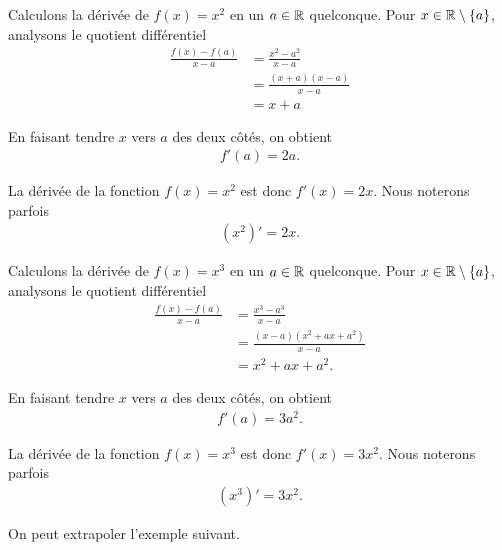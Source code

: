 \documentclass[main.tex]{subfiles}
\begin{document}
\begin{example}
    [Dérivée de $x^2$]

    Calculons la dérivée de $f(x) = x^2$ en un $a \in \mathbb{R}$ quelconque.
    Pour $x \in \mathbb{R} \setminus \{a\}$,
    analysons le quotient différentiel
    \begin{align}
        \frac {f(x) - f(a)}{x - a}
        &= \frac {x^2 - a^2}{x - a}\\
        &= \frac {(x + a)(x - a)}{x - a}\\
        &= x + a
    \end{align}

    En faisant tendre $x$ vers $a$ des deux côtés,
    on obtient
    \begin{align}
        f'(a) = 2a.
    \end{align}
    
    La dérivée de la fonction $f(x) = x^2$ est donc $f'(x) = 2x$.
    Nous noterons parfois
    \begin{align}
        (x^2)'=2x.
    \end{align}
\end{example}

\begin{example}
    [Dérivée de $x^3$]

    Calculons la dérivée de $f(x) = x^3$ en un $a \in \mathbb{R}$ quelconque.
    Pour $x \in \mathbb{R} \setminus \{a\}$,
    analysons le quotient différentiel
    \begin{align}
        \frac {f(x) - f(a)}{x - a}
        &= \frac {x^3 - a^3}{x - a}\\
        &= \frac {(x-a)(x^2 + ax + a^2)}{x - a}\\
        &= x^2 + ax + a^2.
    \end{align}

    En faisant tendre $x$ vers $a$ des deux côtés,
    on obtient
    \begin{align}
        f'(a) = 3a^2.
    \end{align}
    
    La dérivée de la fonction $f(x) = x^3$ est donc $f'(x) = 3x^2$.
    Nous noterons parfois
    \begin{align}
        (x^3)'=3x^2.
    \end{align}
\end{example}

On peut extrapoler l'exemple suivant.
\end{document}
